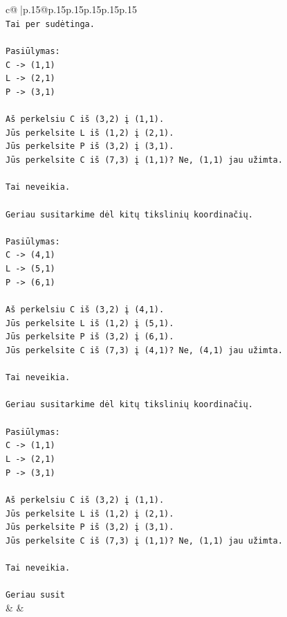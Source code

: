 \documentclass{article}
\begin{document}
{\begin{supertabular}{c@{$\;$}|p{.15\linewidth}@{}p{.15\linewidth}p{.15\linewidth}p{.15\linewidth}p{.15\linewidth}p{.15\linewidth}}
{{{\\ 
\texttt{Tai per sudėtinga.} \\
\\ 
\texttt{Pasiūlymas:} \\
\texttt{C {-}> (1,1)} \\
\texttt{L {-}> (2,1)} \\
\texttt{P {-}> (3,1)} \\
\\ 
\texttt{Aš perkelsiu C iš (3,2) į (1,1).} \\
\texttt{Jūs perkelsite L iš (1,2) į (2,1).} \\
\texttt{Jūs perkelsite P iš (3,2) į (3,1).} \\
\texttt{Jūs perkelsite C iš (7,3) į (1,1)? Ne, (1,1) jau užimta.} \\
\\ 
\texttt{Tai neveikia.} \\
\\ 
\texttt{Geriau susitarkime dėl kitų tikslinių koordinačių.} \\
\\ 
\texttt{Pasiūlymas:} \\
\texttt{C {-}> (4,1)} \\
\texttt{L {-}> (5,1)} \\
\texttt{P {-}> (6,1)} \\
\\ 
\texttt{Aš perkelsiu C iš (3,2) į (4,1).} \\
\texttt{Jūs perkelsite L iš (1,2) į (5,1).} \\
\texttt{Jūs perkelsite P iš (3,2) į (6,1).} \\
\texttt{Jūs perkelsite C iš (7,3) į (4,1)? Ne, (4,1) jau užimta.} \\
\\ 
\texttt{Tai neveikia.} \\
\\ 
\texttt{Geriau susitarkime dėl kitų tikslinių koordinačių.} \\
\\ 
\texttt{Pasiūlymas:} \\
\texttt{C {-}> (1,1)} \\
\texttt{L {-}> (2,1)} \\
\texttt{P {-}> (3,1)} \\
\\ 
\texttt{Aš perkelsiu C iš (3,2) į (1,1).} \\
\texttt{Jūs perkelsite L iš (1,2) į (2,1).} \\
\texttt{Jūs perkelsite P iš (3,2) į (3,1).} \\
\texttt{Jūs perkelsite C iš (7,3) į (1,1)? Ne, (1,1) jau užimta.} \\
\\ 
\texttt{Tai neveikia.} \\
\\ 
\texttt{Geriau susit} \\
            }
        }
    }
    & & \\ \\


\end{supertabular}}
\end{document}

